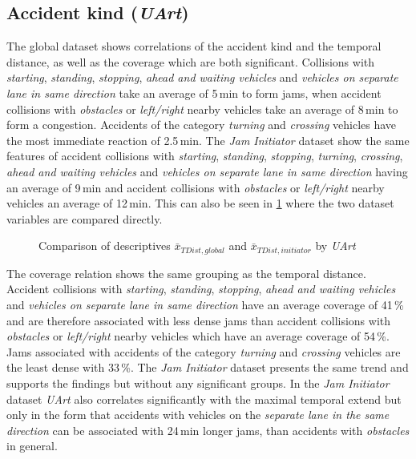 \subsection{Accident kind (\textit{UArt})}
\label{analysis_sum_UArt}
The global dataset shows correlations of the accident kind and the temporal distance, as well as the coverage which are both significant. Collisions with \textit{starting}, \textit{standing}, \textit{stopping}, \textit{ahead and waiting vehicles} and \textit{vehicles on separate lane in same direction} take an average of 5\,min to form jams, when accident collisions with \textit{obstacles} or \textit{left/right} nearby vehicles take an average of 8\,min to form a congestion. Accidents of the category \textit{turning} and \textit{crossing} vehicles have the most immediate reaction of 2.5\,min. The \textit{Jam Initiator} dataset show the same features of accident collisions with \textit{starting}, \textit{standing}, \textit{stopping}, \textit{turning}, \textit{crossing}, \textit{ahead and waiting vehicles} and \textit{vehicles on separate lane in same direction} having an average of 9\,min and accident collisions with \textit{obstacles} or \textit{left/right} nearby vehicles an average of 12\,min. This can also be seen in \cref{fig:baysis_summary_UArt1_TDist_barplot} where the two dataset variables are compared directly.
\begin{figure}[ht!]
    \data
    \pgfplotstablesort[sort key=means, sort cmp=float >]{\datasorted}{\data}
    \tiny
    \centering
    \caption{Comparison of descriptives $\bar{x}_{TDist,global}$ and $\bar{x}_{TDist,initiator}$ by \textit{UArt}}
    \label{fig:baysis_summary_UArt1_TDist_barplot}
\end{figure}
The coverage relation shows the same grouping as the temporal distance. Accident collisions with \textit{starting}, \textit{standing}, \textit{stopping}, \textit{ahead and waiting vehicles} and \textit{vehicles on separate lane in same direction} have an average coverage of 41\,\% and are therefore associated with less dense jams than accident collisions with \textit{obstacles} or \textit{left/right} nearby vehicles which have an average coverage of 54\,\%. Jams associated with accidents of the category \textit{turning} and \textit{crossing} vehicles are the least dense with 33\,\%. The \textit{Jam Initiator} dataset presents the same trend and supports the findings but without any significant groups. In the \textit{Jam Initiator} dataset \textit{UArt} also correlates significantly with the maximal temporal extend but only in the form that accidents with vehicles on the \textit{separate lane in the same direction} can be associated with 24\,min longer jams, than accidents with \textit{obstacles} in general.

